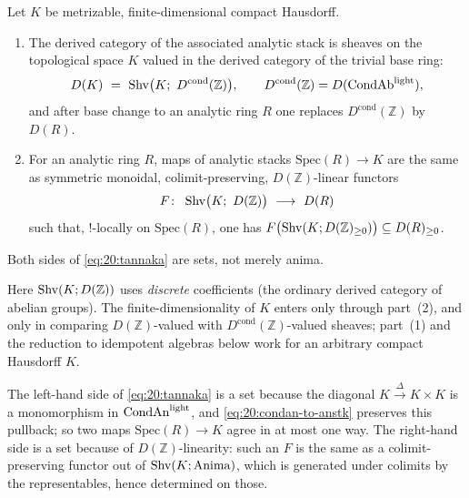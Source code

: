 \begin{theorem}
\label{thm:20:compact-hausdorff}
Let $K$ be metrizable, finite-dimensional compact Hausdorff.
\begin{enumerate}
\item The derived category of the associated analytic stack is sheaves on the
topological space $K$ valued in the derived category of the trivial base ring:
\begin{equation*}
D(K)\ =\ \operatorname{Shv}\bigl(K;\ D^{\mathrm{cond}}(\mathbb Z)\bigr),
\qquad D^{\mathrm{cond}}(\mathbb Z)=D(\mathrm{CondAb}^{\mathrm{light}}),
\end{equation*}
and after base change to an analytic ring $R$ one replaces $D^{\mathrm{cond}}
(\mathbb Z)$ by $D(R)$.
\item For an analytic ring $R$, maps of analytic stacks $\mathrm{Spec}(R)\to K$
are the same as symmetric monoidal, colimit-preserving, $D(\mathbb Z)$-linear
functors
\begin{equation}
\label{eq:20:tannaka}
F\colon\ \Shv\bigl(K;\ D(\mathbb Z)\bigr)\ \longrightarrow\ D(R)
\end{equation}
such that, $!$-locally on $\mathrm{Spec}(R)$, one has
$F\bigl(\operatorname{Shv}(K;D(\mathbb Z)_{\ge0})\bigr)\subseteq D(R)_{\ge0}$.
\end{enumerate}
Both sides of \eqref{eq:20:tannaka} are sets, not merely anima.
\end{theorem}

Here $\operatorname{Shv}(K;D(\mathbb Z))$ uses \emph{discrete} coefficients (the ordinary
derived category of abelian groups). The finite-dimensionality of $K$ enters
only through part~(2), and only in comparing $D(\mathbb Z)$-valued with
$D^{\mathrm{cond}}(\mathbb Z)$-valued sheaves; part~(1) and the reduction to
idempotent algebras below work for an arbitrary compact Hausdorff $K$.

\begin{remark}
\label{rmk:20:both-sets}
The left-hand side of \eqref{eq:20:tannaka} is a set because the diagonal
$K\xrightarrow{\Delta}K\times K$ is a monomorphism in $\operatorname{CondAn}^{\mathrm{light}}$,
and \eqref{eq:20:condan-to-anstk} preserves this pullback; so two maps
$\mathrm{Spec}(R)\to K$ agree in at most one way. The right-hand side is a set
because of $D(\mathbb Z)$-linearity: such an $F$ is the same as a
colimit-preserving functor out of $\operatorname{Shv}(K;\mathrm{Anima})$, which is generated
under colimits by the representables, hence determined on those.
\end{remark}

